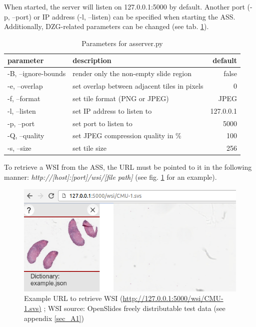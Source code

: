 When started, the server will listen on 127.0.0.1:5000 by default. Another port (-p, --port) or IP address (-l, --listen) can be specified when starting the ASS. Additionally, DZG-related parameters can be changed (see tab. \ref{tab4_assParams}).

\begin{table}[H]
	\begin{center}
		\begin{tabular}{| l | l | r |}
			\hline
			\textbf{parameter} & \textbf{description} & \textbf{default}\\ \hline
			-B, --ignore-bounds & render only the non-empty slide region & false\\ \hline
			-e, --overlap & set overlap between adjacent tiles in pixels & 0 \\ \hline
			-f, --format & set tile format (PNG or JPEG) & JPEG \\ \hline
			-l, --listen & set IP address to listen to & 127.0.0.1\\ \hline
			-p, --port & set port to listen to & 5000\\ \hline
			-Q, --quality & set JPEG compression quality in \% & 100\\ \hline
			-s, --size & set tile size & 256\\ \hline
		\end{tabular}
		\caption{Parameters for as{\textunderscore}server.py}
		\label{tab4_assParams}
	\end{center}
\end{table}

To retrieve a WSI from the ASS, the URL must be pointed to it in the following manner: \emph{http://[host]:[port]/wsi/[file path]} (see fig. \ref{fig4_wsiUrl} for an example).

\begin{figure}[H]
	\begin{center}
		\includegraphics[scale=0.4]{img/wsiUrl.png}
		\caption{Example URL to retrieve WSI (\url{http://127.0.0.1:5000/wsi/CMU-1.svs)}
		\label{fig4_wsiUrl}; WSI source: OpenSlides freely distributable test data (see appendix \ref{sec_A1})}
	\end{center}
\end{figure}


